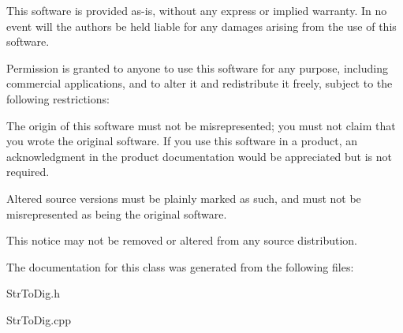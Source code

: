 This software is provided \textquotesingle{}as-\/is\textquotesingle{}, without any express or implied warranty. In no event will the authors be held liable for any damages arising from the use of this software.

Permission is granted to anyone to use this software for any purpose, including commercial applications, and to alter it and redistribute it freely, subject to the following restrictions\+:


\begin{DoxyEnumerate}
\item The origin of this software must not be misrepresented; you must not claim that you wrote the original software. If you use this software in a product, an acknowledgment in the product documentation would be appreciated but is not required.
\item Altered source versions must be plainly marked as such, and must not be misrepresented as being the original software.
\item This notice may not be removed or altered from any source distribution. 
\end{DoxyEnumerate}

The documentation for this class was generated from the following files\+:\begin{DoxyCompactItemize}
\item 
Str\+To\+Dig.\+h\item 
Str\+To\+Dig.\+cpp\end{DoxyCompactItemize}
